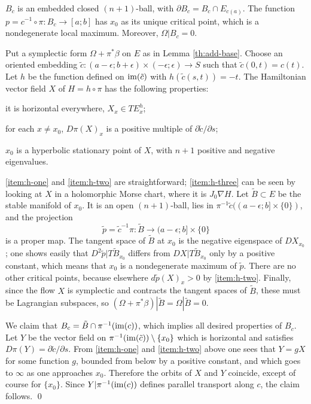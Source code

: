 \documentclass[10pt,letterpaper]{article}
\begin{document}
\begin{lemma} \label{th:vanishing-ball}
$B_c$ is an embedded closed $(n+1)$-ball, with $\partial B_c = B_c \cap
E_{c(a)}$. The function $p = c^{-1} \circ \pi: B_c \rightarrow [a;b]$ has $x_0$
as its unique critical point, which is a nondegenerate local maximum. Moreover,
$\Omega|B_c = 0$.
\end{lemma}

\proof Put a symplectic form $\Omega + \pi^*\beta$ on $E$ as in Lemma
\ref{th:add-base}. Choose an oriented embedding $\tilde{c}:
(a-\epsilon;b+\epsilon) \times (-\epsilon;\epsilon) \rightarrow S$ such that
$\tilde{c}(0,t) = c(t)$. Let $h$ be the function defined on $\mathrm{im}(\tilde{c})$
with $h(\tilde{c}(s,t)) = -t$. The Hamiltonian vector field $X$ of $H = h \circ
\pi$ has the following properties:
\begin{condensedlist}
\item \label{item:h-one}
it is horizontal everywhere, $X_x \in TE^h_x$;
\item \label{item:h-two}
for each $x \neq x_0$, $D\pi(X)_x$ is a positive multiple of
$\partial\tilde{c}/\partial s$;
\item \label{item:h-three}
$x_0$ is a hyperbolic stationary point of $X$, with $n+1$ positive and negative
eigenvalues.
\end{condensedlist}
\ref{item:h-one} and \ref{item:h-two} are straightforward; \ref{item:h-three}
can be seen by looking at $X$ in a holomorphic Morse chart, where it is
$J_0\nabla H$. Let $\tilde{B} \subset E$ be the stable manifold of $x_0$. It is
an open $(n+1)$-ball, lies in $\pi^{-1}\tilde{c}((a-\epsilon;b] \times \{0\})$,
and the projection
\[
 \tilde{p} = \tilde{c}^{-1}\pi : \tilde{B} \longrightarrow
 (a-\epsilon;b] \times \{0\}
\]
is a proper map. The tangent space of $\tilde{B}$ at $x_0$ is the negative
eigenspace of $DX_{x_0}$; one shows easily that $D^2\tilde{p}|T\tilde{B}_{x_0}$
differs from $DX|T\tilde{B}_{x_0}$ only by a positive constant, which means
that $x_0$ is a nondegenerate maximum of $\tilde{p}$. There are no other
critical points, because elsewhere $d\tilde{p}(X)_x>0$ by \ref{item:h-two}.
Finally, since the flow $X$ is symplectic and contracts the tangent spaces of
$\tilde{B}$, these must be Lagrangian subspaces, so $(\Omega +
\pi^*\beta)|\tilde{B} = \Omega|\tilde{B} = 0$.

We claim that $B_c = \tilde{B} \cap \pi^{-1}(\mathrm{im}(c))$, which implies all
desired properties of $B_c$. Let $Y$ be the vector field on
$\pi^{-1}(\mathrm{im}(\tilde{c})) \setminus \{x_0\}$ which is horizontal and satisfies
$D\pi(Y) = \partial\tilde{c}/\partial s$. From \ref{item:h-one} and
\ref{item:h-two} above one sees that $Y = gX$ for some function $g$, bounded
from below by a positive constant, and which goes to $\infty$ as one approaches
$x_0$. Therefore the orbits of $X$ and $Y$ coincide, except of course for
$\{x_0\}$. Since $Y|\pi^{-1}(\mathrm{im}(c))$ defines parallel transport along $c$, the
claim follows. \qed
\end{document}
